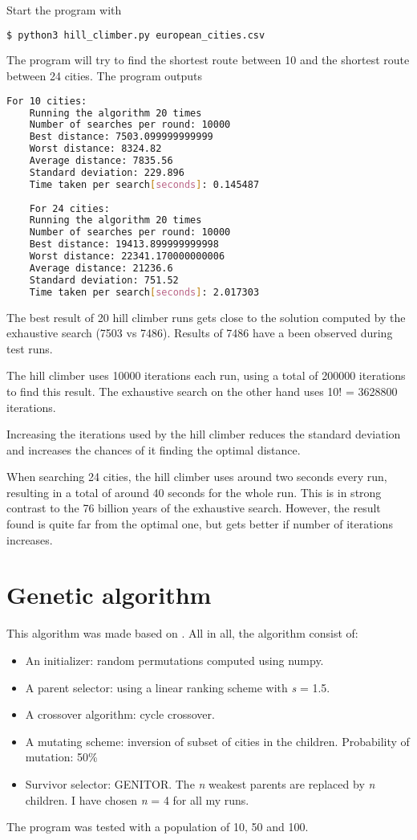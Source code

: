 \documentclass{article}
\begin{document}
Start the program with
\begin{lstlisting}[language=bash]
	$ python3 hill_climber.py european_cities.csv 
\end{lstlisting}
The program will try to find the shortest route between 10 and the shortest route between 24 cities. The program outputs

\begin{lstlisting}[language=bash]
	For 10 cities:
	Running the algorithm 20 times
	Number of searches per round: 10000
	Best distance: 7503.099999999999
	Worst distance: 8324.82
	Average distance: 7835.56
	Standard deviation: 229.896
	Time taken per search[seconds]: 0.145487
 
	For 24 cities:
	Running the algorithm 20 times
	Number of searches per round: 10000
	Best distance: 19413.899999999998
	Worst distance: 22341.170000000006
	Average distance: 21236.6
	Standard deviation: 751.52
	Time taken per search[seconds]: 2.017303
\end{lstlisting}
\noindent
The best result of 20 hill climber runs gets close to the solution computed by the exhaustive search (7503 vs 7486). Results of 7486 have a been observed during test runs.

The hill climber uses 10000 iterations each run, using a total of 200000 iterations to find this result. The exhaustive search on the other hand uses 10! = 3628800 iterations.

Increasing the iterations used by the hill climber reduces the standard deviation and increases the chances of it finding the optimal distance.

When searching 24 cities, the hill climber uses around two seconds every run, resulting in a total of around 40 seconds for the whole run. This is in strong contrast to the 76 billion years of the exhaustive search. However, the result found is quite far from the optimal one, but gets better if number of iterations increases.

\section{Genetic algorithm}
This algorithm was made based on \cite[chapter 3 - 6]{eiben}. All in all, the algorithm consist of:
\begin{itemize}
\item An initializer: random permutations computed using numpy.
\item A parent selector: using a linear ranking scheme with \textit{s} = 1.5.
\item A crossover algorithm: cycle crossover.
\item A mutating scheme: inversion of subset of cities in the children. Probability of mutation: 50\%
\item Survivor selector: GENITOR. The \textit{n} weakest parents are replaced by \textit{n} children. I have chosen \textit{n} = 4 for all my runs.
\end{itemize}
\noindent
The program was tested with a population of 10, 50 and 100.
\end{document}
